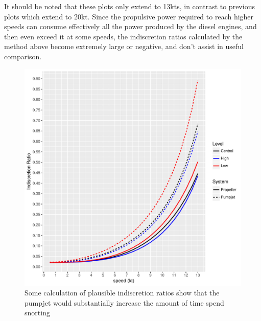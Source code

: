 \documentclass{article}\usepackage[]{graphicx}\usepackage[]{color}
\makeatletter
\def\maxwidth{ %
  \ifdim\Gin@nat@width>\linewidth
    \linewidth
  \else
    \Gin@nat@width
  \fi
}
\newenvironment{knitrout}{}{} %
\makeatother
\begin{document}
It should be noted that these plots only extend to 13kts, in contrast to previous plots which extend to 20kt.  Since the propulsive power required to reach higher speeds can consume effectively all the power produced by the diesel engines, and then even exceed it at some speeds, the indiscretion ratios calculated by the method above become extremely large or negative, and don't assist in useful comparison.

\begin{figure}
\begin{knitrout}
\color{fgcolor}

{\centering \includegraphics[width=\maxwidth]{figures/plots-plot_IR-1} 

}



\end{knitrout}
\caption{Some calculation of plausible indiscretion ratios show that the pumpjet would substantially increase the amount of time spend snorting}
\label{fig:IRs}
\end{figure}
\end{document}
